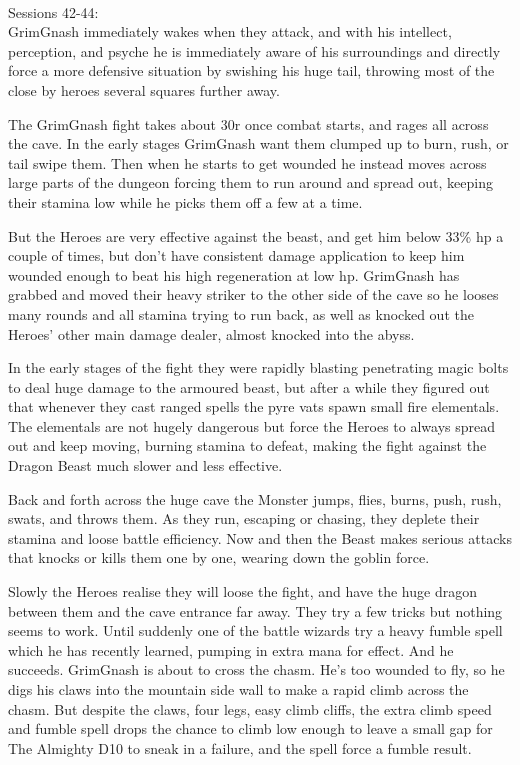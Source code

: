 \


\forceindent Sessions 42-44:\\   
GrimGnash immediately wakes when they attack, and with his intellect, perception, and psyche he is immediately aware of his surroundings and directly force a more defensive situation by swishing his huge tail, throwing most of the close by heroes several squares further away.

The GrimGnash fight takes about 30r once combat starts, and rages all across the cave. In the early stages GrimGnash want them clumped up to burn, rush, or tail swipe them. Then when he starts to get wounded he instead moves across large parts of the dungeon forcing them to run around and spread out, keeping their stamina low while he picks them off a few at a time.

But the Heroes are very effective against the beast, and get him below 33\% hp a couple of times, but don't have consistent damage application to keep him wounded enough to beat his high regeneration at low hp. GrimGnash has grabbed and moved their heavy striker to the other side of the cave so he looses many rounds and all stamina trying to run back, as well as knocked out the Heroes' other main damage dealer, almost knocked into the abyss.

In the early stages of the fight they were rapidly blasting penetrating magic bolts to deal huge damage to the armoured beast, but after a while they figured out that whenever they cast ranged spells the pyre vats spawn small fire elementals. The elementals are not hugely dangerous but force the Heroes to always spread out and keep moving, burning stamina to defeat, making the fight against the Dragon Beast much slower and less effective.

Back and forth across the huge cave the Monster jumps, flies, burns, push, rush, swats, and throws them. As they run, escaping or chasing, they deplete their stamina and loose battle efficiency. Now and then the Beast makes serious attacks that knocks or kills them one by one, wearing down the goblin force.

Slowly the Heroes realise they will loose the fight, and have the huge dragon between them and the cave entrance far away. They try a few tricks but nothing seems to work. Until suddenly one of the battle wizards try a heavy fumble spell which he has recently learned, pumping in extra mana for effect. And he succeeds. GrimGnash is about to cross the chasm. He's too wounded to fly, so he digs his claws into the mountain side wall to make a rapid climb across the chasm. But despite the claws, four legs, easy climb cliffs, the extra climb speed and fumble spell drops the chance to climb low enough to leave a small gap for The Almighty D10 to sneak in a failure, and the spell force a fumble result.

